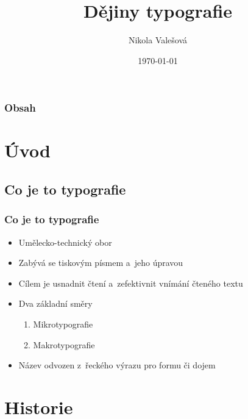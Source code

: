 \documentclass{beamer}
\title{Dějiny typografie}
\author{Nikola Valešová}
\institute{Fakulta informačních technologií\\
Vysoké učení technické v~Brně}
\date{\today}
\begin{document}
\begin{frame}
\titlepage
{}
\begin{center}
\insertlogo
\end{center}
\end{frame}

\begin{frame}
\frametitle{Obsah}
\tableofcontents
\end{frame}

\section{Úvod}
\subsection{Co je to typografie}
\begin{frame}\frametitle{Co je to typografie}
\begin{itemize}
\item Umělecko-technický obor \pause
\item Zabývá se tiskovým písmem a~jeho úpravou \pause
\item Cílem je usnadnit čtení a~zefektivnit vnímání čteného textu \pause
\item Dva základní směry \pause
\begin{enumerate}
\item{Mikrotypografie} \pause
\item{Makrotypografie} \pause
\end{enumerate}
\item{Název odvozen z~řeckého výrazu pro formu či dojem}
\end{itemize} 
\end{frame}

\section{Historie} 
\end{document}
